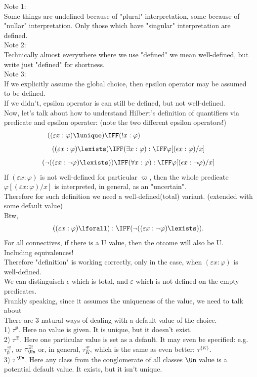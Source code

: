 \def\topic{}


Note 1:\\
Some things are undefined because of "plural" interpretation, some because of "nullar" interpretation. Only those which have "singular" interpretation are defined.\\
Note 2:\\
Technically almost everywhere where we use "defined" we mean well-defined, but write just "defined" for shortness.\\
Note 3:\\
If we explicitly assume the global choice, then epsilon operator may be assumed to be defined.\\
If we didn't, epsilon operator is can still be defined, but not well-defined.\\

Now, let's talk about how to understand Hilbert's definition of quantifiers via predicate and epsilon operater: (note the two different epsilon operators!)
\[
((\varepsilon x:\varphi) \lunique) \IFF (! x:\varphi)
\quad\quad\quad\quad\quad\quad\quad\quad\quad\quad
\]
\[
((\varepsilon x:\varphi) \lexists) \IFF (\exists x:\varphi):\IFF \varphi[(\epsilon x:\varphi)/x]
\]
\[
(\neg((\varepsilon x:\neg\varphi) \lexists)) \IFF (\forall x:\varphi):\IFF \varphi[(\epsilon x:\neg\varphi)/x]
\]
If $(\varepsilon x:\varphi)$ is not well-defined for particular $\varpi$, then the whole predicate $\varphi[(\varepsilon x:\varphi)/x]$ is interpreted, in general, as an "uncertain".\\
Therefore for such definition we need a well-defined(total) variant. (extended with some default value)
\\
Btw,
\[
((\varepsilon x:\varphi) \lforall) :\IFF (\neg((\varepsilon x:\neg\varphi) \lexists)).
\]
For all connectives, if there is a U value, then the otcome will also be U.\\
Including equivalences!\\
Therefore "definition" is working correctly, only in the case, when $(\varepsilon x:\varphi)$ is well-defined.\\
We can distinguisch $\epsilon$ which is total, and $\varepsilon$ which is not defined on the empty predicates.\\
Frankly speaking, since it assumes the uniqueness of the value, we need to talk about\\

There are 3 natural ways of dealing with a default value of the choice.\\
1) $\tau^\emptyset$. Here no value is given. It is unique, but it doesn't exist.\\
2) $\tau^{\exists!}$. Here one particular value is set as a default. It may even be specified: e.g. $\tau^{\exists!}_\emptyset$, or $\tau^{\exists!}_\Un$ or, in general, $\tau^{\exists!}_K$, which is the same as even better: $\tau^{\{K\}}$.\\
3) $\tau^\Un$. Here any class from the conglomerate of all classes $\Un$ value is a potential default value. It exists, but it isn't unique.\\


